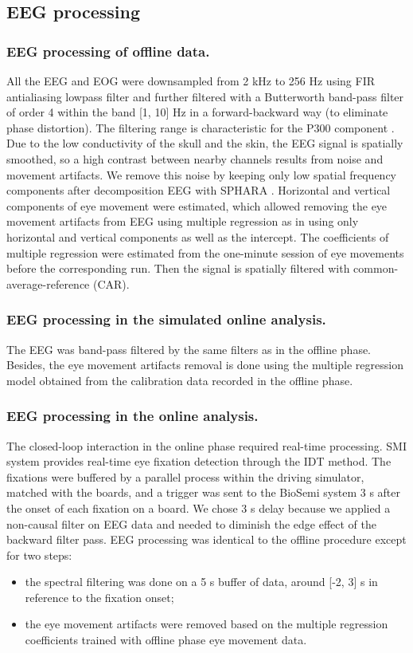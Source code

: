 \documentclass[12pt]{iopart}
\begin{document}
\subsection{EEG processing}
\subsubsection*{EEG processing of offline data.}
All the EEG and EOG were downsampled from 2 kHz to 256 Hz
using FIR antialiasing lowpass filter
and further filtered  with a Butterworth band-pass filter
of order 4 within the band [1, 10] Hz  in a forward-backward way (to eliminate phase distortion).
The filtering range is characteristic for the P300 component \cite{demiralp_wavelet_2001}.
Due to the low conductivity of the skull and the skin,
the EEG signal is spatially smoothed, so a high contrast between nearby channels
results from noise and movement artifacts. We remove this noise
by keeping only low spatial frequency components after decomposition EEG with SPHARA \cite{graichen_sphara_2015}.
Horizontal and vertical components of eye movement were estimated, which allowed
removing the eye movement artifacts from EEG using multiple regression 
as in \cite{schlogl_fully_2007} using only horizontal and vertical 
components as well as the intercept.
The coefficients of multiple regression were estimated from the 
one-minute session of eye movements before the corresponding run.
Then the signal is spatially
filtered with common-average-reference (CAR). 

\subsubsection*{EEG processing in the simulated online analysis.}
The EEG was  band-pass filtered by the same filters as in the offline phase. Besides, the eye movement artifacts removal is done using the multiple regression model obtained from the calibration data recorded in the offline phase.

\subsubsection*{EEG processing in the online analysis.}
The closed-loop interaction in the online phase required real-time processing.
SMI system provides
real-time eye fixation detection through the IDT method. The fixations were buffered
by a parallel process within the driving simulator, matched with the boards,
and a trigger was sent to the BioSemi system 3 s after the onset of each fixation
on a board. We chose 3 s delay because we applied a non-causal filter on EEG data
and needed to diminish the edge effect of the backward filter pass.
EEG processing  was identical to the offline procedure
except for two steps:
\begin{itemize}
    \item the spectral filtering was done on a 5 s buffer of data,
        around [-2, 3] s in reference to the fixation onset;
    \item the eye movement artifacts were removed based on the multiple
        regression coefficients trained with offline phase eye movement data.
\end{itemize}
\end{document}
